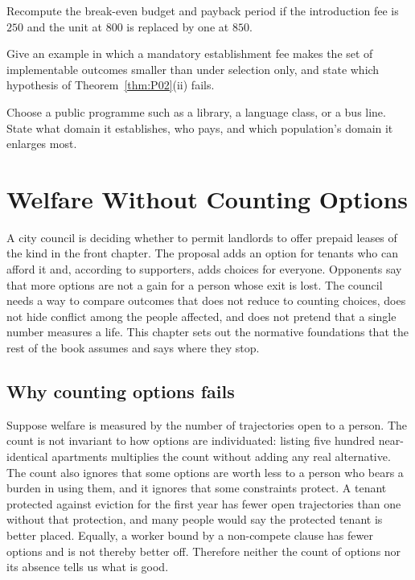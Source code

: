 \begin{exercise}
Recompute the break-even budget and payback period if the introduction fee is $250$ and the unit at $800$ is replaced by one at $850$.
\end{exercise}
\begin{exercise}
Give an example in which a mandatory establishment fee makes the set of implementable outcomes smaller than under selection only, and state which hypothesis of Theorem~\ref{thm:P02}(ii) fails.
\end{exercise}
\begin{exercise}
Choose a public programme such as a library, a language class, or a bus line. State what domain it establishes, who pays, and which population's domain it enlarges most.
\end{exercise}

\chapter{Welfare Without Counting Options}\label{ch:5}

A city council is deciding whether to permit landlords to offer prepaid leases of the kind in the front chapter. The proposal adds an option for tenants who can afford it and, according to supporters, adds choices for everyone. Opponents say that more options are not a gain for a person whose exit is lost. The council needs a way to compare outcomes that does not reduce to counting choices, does not hide conflict among the people affected, and does not pretend that a single number measures a life. This chapter sets out the normative foundations that the rest of the book assumes and says where they stop.

\section{Why counting options fails}

Suppose welfare is measured by the number of trajectories open to a person. The count is not invariant to how options are individuated: listing five hundred near-identical apartments multiplies the count without adding any real alternative. The count also ignores that some options are worth less to a person who bears a burden in using them, and it ignores that some constraints protect. A tenant protected against eviction for the first year has fewer open trajectories than one without that protection, and many people would say the protected tenant is better placed. Equally, a worker bound by a non-compete clause has fewer options and is not thereby better off. Therefore neither the count of options nor its absence tells us what is good.

